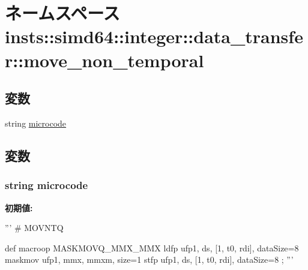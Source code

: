 \hypertarget{namespaceinsts_1_1simd64_1_1integer_1_1data__transfer_1_1move__non__temporal}{
\section{ネームスペース insts::simd64::integer::data\_\-transfer::move\_\-non\_\-temporal}
\label{namespaceinsts_1_1simd64_1_1integer_1_1data__transfer_1_1move__non__temporal}
}
\subsection*{変数}
\begin{DoxyCompactItemize}
\item 
string \hyperlink{namespaceinsts_1_1simd64_1_1integer_1_1data__transfer_1_1move__non__temporal_a770f11a173e99389a8802f0107ed8f52}{microcode}
\end{DoxyCompactItemize}


\subsection{変数}
\hypertarget{namespaceinsts_1_1simd64_1_1integer_1_1data__transfer_1_1move__non__temporal_a770f11a173e99389a8802f0107ed8f52}{
\subsubsection[{microcode}]{\setlength{\rightskip}{0pt plus 5cm}string {\bf microcode}}}
\label{namespaceinsts_1_1simd64_1_1integer_1_1data__transfer_1_1move__non__temporal_a770f11a173e99389a8802f0107ed8f52}
{\bfseries 初期値:}
\begin{DoxyCode}
'''
# MOVNTQ

def macroop MASKMOVQ_MMX_MMX {
    ldfp ufp1, ds, [1, t0, rdi], dataSize=8
    maskmov ufp1, mmx, mmxm, size=1
    stfp ufp1, ds, [1, t0, rdi], dataSize=8
};
'''
\end{DoxyCode}
